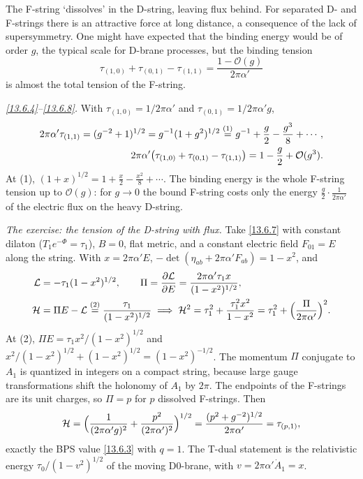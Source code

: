 The F-string `dissolves' in the D-string, leaving flux behind. For separated D- and F-strings there is an attractive force at long distance, a consequence of the lack of supersymmetry. One might have expected that the binding energy would be of order $g$, the typical scale for D-brane processes, but the binding tension
\begin{equation}
	\tau_{(1,0)} + \tau_{(0,1)} - \tau_{(1,1)} = \frac{1 - \mathcal{O}(g)}{2\pi\alpha'} \label{13.6.8}
\end{equation}
is almost the total tension of the F-string.
\begin{tcolorbox}[breakable]
	\begin{remark}
		\textit{\eqref{13.6.4}--\eqref{13.6.8}.} With $\tau_{(1,0)}=1/2\pi\alpha'$ and $\tau_{(0,1)}=1/2\pi\alpha'g$,
		\begin{align*}
			2\pi\alpha'\tau_{(1,1)} = (g^{-2}+1)^{1/2} = g^{-1}(1+g^2)^{1/2} \overset{(1)}{=} g^{-1}+\frac g2-\frac{g^3}{8}+\cdots,\\
			2\pi\alpha'\bigl(\tau_{(1,0)}+\tau_{(0,1)}-\tau_{(1,1)}\bigr) = 1-\frac g2+\mathcal O(g^3) .
		\end{align*}
		At (1), $(1+x)^{1/2}=1+\frac x2-\frac{x^2}8+\cdots$. The binding energy is the whole F-string tension up to $\mathcal O(g)$: for $g\to0$ the bound F-string costs only the energy $\frac{g}{2}\cdot\frac1{2\pi\alpha'}$ of the electric flux on the heavy D-string.

		\textit{The exercise: the tension of the D-string with flux.} Take \eqref{13.6.7} with constant dilaton ($T_1e^{-\Phi}=\tau_1$), $B=0$, flat metric, and a constant electric field $F_{01}=E$ along the string. With $x=2\pi\alpha'E$, $-\det(\eta_{ab}+2\pi\alpha'F_{ab})=1-x^2$, and
		\begin{align*}
			\mathcal L &= -\tau_1(1-x^2)^{1/2},\qquad
			\Pi=\frac{\partial\mathcal L}{\partial E}=\frac{2\pi\alpha'\tau_1x}{(1-x^2)^{1/2}},\\
			\mathcal H &= \Pi E-\mathcal L \overset{(2)}{=} \frac{\tau_1}{(1-x^2)^{1/2}} \;\Longrightarrow\; \mathcal H^2 = \tau_1^2+\frac{\tau_1^2x^2}{1-x^2} = \tau_1^2+\Bigl(\frac{\Pi}{2\pi\alpha'}\Bigr)^2 .
		\end{align*}
		At (2), $\Pi E=\tau_1x^2/(1-x^2)^{1/2}$ and $x^2/(1-x^2)^{1/2}+(1-x^2)^{1/2}=(1-x^2)^{-1/2}$. The momentum $\Pi$ conjugate to $A_1$ is quantized in integers on a compact string, because large gauge transformations shift the holonomy of $A_1$ by $2\pi$. The endpoints of the F-strings are its unit charges, so $\Pi=p$ for $p$ dissolved F-strings. Then
		\begin{equation*}
			\mathcal H = \Bigl(\frac1{(2\pi\alpha'g)^2}+\frac{p^2}{(2\pi\alpha')^2}\Bigr)^{1/2} = \frac{(p^2+g^{-2})^{1/2}}{2\pi\alpha'} = \tau_{(p,1)} ,
		\end{equation*}
		exactly the BPS value \eqref{13.6.3} with $q=1$. The T-dual statement is the relativistic energy $\tau_0/(1-v^2)^{1/2}$ of the moving D0-brane, with $v=2\pi\alpha'\dot A_1=x$.
	\end{remark}
\end{tcolorbox}

